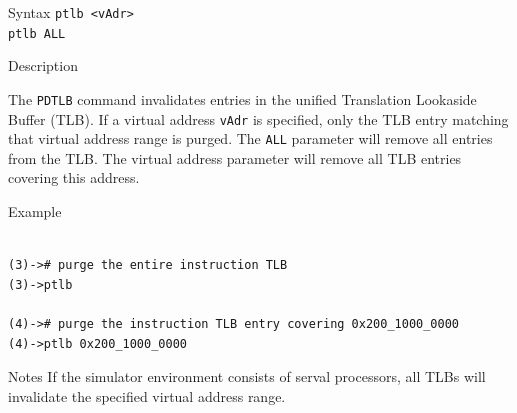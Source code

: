%
%
\pagebreak
{}

\begin{iPageDescEntry}{Syntax}
\texttt{ptlb <vAdr> } \\
\texttt{ptlb ALL }
\end{iPageDescEntry}

\begin{iPageDescEntry}{Description}

The \texttt{PDTLB} command invalidates entries in the unified Translation Lookaside Buffer (TLB). If a virtual address \texttt{vAdr} is specified, only the TLB entry matching that virtual address range is purged. The \texttt{ALL} parameter will remove all entries from the TLB. The virtual address parameter will remove all TLB entries covering this address. 

\end{iPageDescEntry}

\begin{iPageDescOpEntry}{Example}
\begin{lstlisting}[style=iPageOpStyle]

(3)-># purge the entire instruction TLB
(3)->ptlb

(4)-># purge the instruction TLB entry covering 0x200_1000_0000
(4)->ptlb 0x200_1000_0000

\end{lstlisting}
\end{iPageDescOpEntry}

\begin{iPageDescEntry}{Notes}
If the simulator environment consists of serval processors, all TLBs will invalidate the specified virtual address range.
\end{iPageDescEntry}
